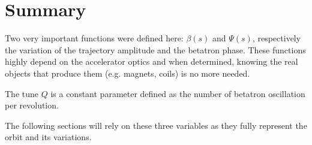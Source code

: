 \section{Summary}
Two very important functions were defined here: $\beta (s)$ and $\Psi (s)$, respectively the variation of the trajectory amplitude and the betatron phase. These functions highly depend on the accelerator optics and when determined, knowing the real objects that produce them (e.g. magnets, coils) is no more needed.

The tune $Q$ is a constant parameter defined as the number of betatron oscillation per revolution.

The following sections will rely on these three variables as they fully represent the orbit and its variations.
